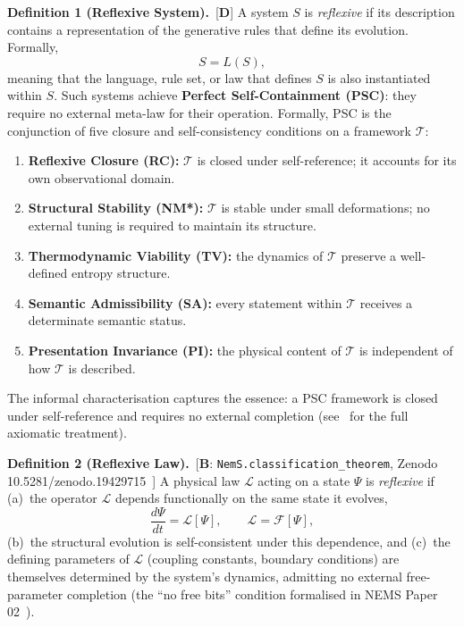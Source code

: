 \documentclass[11pt]{article}
\newcommand{\CatB}{\textbf{B}}
\newcommand{\CatD}{\textbf{D}}
\begin{document}
\textbf{Definition 1 (Reflexive System).}~[$\CatD$]
A system \(S\) is \emph{reflexive} if its description contains a
representation of the generative rules that define its evolution.
Formally,
\[
S = L(S),
\]
meaning that the language, rule set, or law that defines \(S\) is also
instantiated within \(S\).
Such systems achieve \textbf{Perfect Self-Containment (PSC)}: they
require no external meta-law for their operation.
Formally, PSC is the conjunction of five closure and self-consistency
conditions on a framework $\mathcal{T}$:
\begin{enumerate}[label=(\roman*)]
  \item \textbf{Reflexive Closure (RC):} $\mathcal{T}$ is closed under
        self-reference; it accounts for its own observational domain.
  \item \textbf{Structural Stability (NM*):} $\mathcal{T}$ is stable
        under small deformations; no external tuning is required to
        maintain its structure.
  \item \textbf{Thermodynamic Viability (TV):} the dynamics of $\mathcal{T}$
        preserve a well-defined entropy structure.
  \item \textbf{Semantic Admissibility (SA):} every statement within
        $\mathcal{T}$ receives a determinate semantic status.
  \item \textbf{Presentation Invariance (PI):} the physical content of
        $\mathcal{T}$ is independent of how $\mathcal{T}$ is described.
\end{enumerate}
The informal characterisation captures the essence: a PSC framework is
closed under self-reference and requires no external completion
(see~\cite{SpivackPSCConcordance} for the full axiomatic treatment).

\textbf{Definition 2 (Reflexive Law).}~[$\CatB$: \texttt{NemS.classification\_theorem},
Zenodo 10.5281/\allowbreak zenodo.19429715~\cite{SpivackNEMSTheorem}]
A physical law \(\mathcal{L}\) acting on a state \(\Psi\) is
\emph{reflexive} if (a)~the operator \(\mathcal{L}\) depends
functionally on the same state it evolves,
\[
\frac{d\Psi}{dt} = \mathcal{L}[\Psi], \qquad \mathcal{L} = \mathcal{F}[\Psi],
\]
(b)~the structural evolution is self-consistent under this dependence,
and (c)~the defining parameters of \(\mathcal{L}\) (coupling constants,
boundary conditions) are themselves determined by the system's dynamics,
admitting no external free-parameter completion (the ``no free bits''
condition formalised in NEMS Paper 02~\cite{SpivackNEMSTheorem}).
\end{document}

